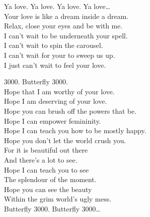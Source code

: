 Ya love. Ya love. Ya love. Ya love… \\

Your love is like a dream inside a dream. \\
Relax, close your eyes and be with me. \\

I can't wait to be underneath your spell. \\
I can't wait to spin the carousel. \\
I can't wait for your to sweep us up. \\
I just can't wait to feel your love. \\





 3000. Butterfly 3000. \\

Hope that I am worthy of your love. \\
Hope I am deserving of your love. \\
Hope you can brush off the powers that be. \\
Hope I can empower femininity. \\

Hope I can teach you how to be mostly happy. \\
Hope you don't let the world crush you. \\
For it is beautiful out there \\
And there's a lot to see. \\

Hope I can teach you to see \\
The splendour of the moment. \\
Hope you can see the beauty \\
Within the grim world's ugly mess. \\

Butterfly 3000. Butterfly 3000… \\

